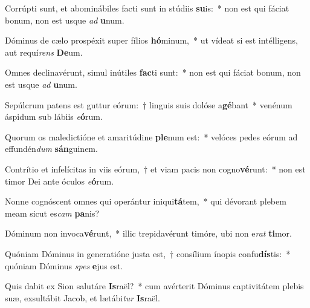 \item Corrúpti sunt, et abominábiles facti sunt in stúdiis \textbf{su}is:~* non est qui fáciat bonum, non est usque \textit{ad} \textbf{u}num.
\item Dóminus de cælo prospéxit super fílios \textbf{hó}minum,~* ut vídeat si est intélligens, aut requí\textit{rens} \textbf{De}um.
\item Omnes declinavérunt, simul inútiles \textbf{fac}ti sunt:~* non est qui fáciat bonum, non est usque \textit{ad} \textbf{u}num.
\item Sepúlcrum patens est guttur eórum:~† linguis suis dolóse a\textbf{gé}bant~* venénum áspidum sub lábiis \textit{e}\textbf{ó}rum.
\item Quorum os maledictióne et amaritúdine \textbf{ple}num est:~* velóces pedes eórum ad effundén\textit{dum} \textbf{sán}guinem.
\item Contrítio et infelícitas in viis eórum,~† et viam pacis non cogno\textbf{vé}runt:~* non est timor Dei ante óculos \textit{e}\textbf{ó}rum.
\item Nonne cognóscent omnes qui operántur iniqui\textbf{tá}tem,~* qui dévorant plebem meam sicut es\textit{cam} \textbf{pa}nis?
\item Dóminum non invoca\textbf{vé}runt,~* illic trepidavérunt timóre, ubi non e\textit{rat} \textbf{ti}mor.
\item Quóniam Dóminus in generatióne justa est,~† consílium ínopis confu\textbf{dís}tis:~* quóniam Dóminus \textit{spes} \textbf{e}jus est.
\item Quis dabit ex Sion salutáre \textbf{Is}raël?~* cum avérterit Dóminus captivitátem plebis suæ, exsultábit Jacob, et lætábi\textit{tur} \textbf{Is}raël.
